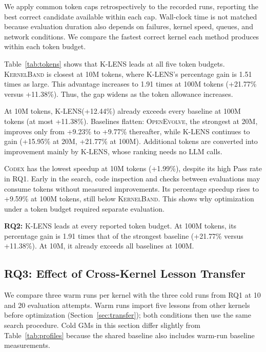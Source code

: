 \documentclass[acmsmall,screen,review,anonymous,nonacm]{acmart}
\newcommand{\klens}{\textsc{K-LENS}\xspace}
\newcommand{\kernelband}{\textsc{KernelBand}\xspace}
\newcommand{\openevolve}{\textsc{OpenEvolve}\xspace}
\newcommand{\standardcodex}{\textsc{Codex}\xspace}
\newenvironment{klensresultbox}{%
  \par\addvspace{0.5\baselineskip plus 2pt}%
  \noindent
  \begingroup
  \setlength{\fboxrule}{0.3mm}%
  \setlength{\fboxsep}{\dimexpr1mm+2pt\relax}%
  \begin{lrbox}{\klensresultcontent}%
  \begin{minipage}{\dimexpr\linewidth-2\fboxrule-2\fboxsep\relax}%
}{%
  \end{minipage}%
  \end{lrbox}%
  \fcolorbox{black!20}{gray!5}{\usebox{\klensresultcontent}}%
  \endgroup
  \par\addvspace{0.5\baselineskip plus 2pt}%
}
\begin{document}
We apply common token caps retrospectively to the recorded runs, reporting the best correct candidate available within each cap.
Wall-clock time is not matched because evaluation duration also depends on failures, kernel speed,
queues, and network conditions. We compare the fastest correct kernel each method produces
within each token budget.


Table~\ref{tab:tokens} shows that \klens leads at all five token budgets.
\kernelband is closest at 10M tokens, where \klens's percentage gain is
1.51 times as large. This advantage increases to 1.91 times at 100M
tokens (+21.77\% versus +11.38\%). Thus, the gap widens as the token
allowance increases.

At 10M tokens, \klens (+12.44\%) already exceeds every baseline at 100M tokens
(at most +11.38\%). Baselines flatten: \openevolve, the strongest at 20M, improves
only from +9.23\% to +9.77\% thereafter, while \klens continues to gain
(+15.95\% at 20M, +21.77\% at 100M). Additional tokens are converted into
improvement mainly by \klens, whose ranking needs no LLM calls.

\standardcodex has the lowest speedup at 10M tokens (+1.99\%), despite
its high Pass rate in RQ1. Early in the search, code inspection and
checks between evaluations may consume tokens without measured
improvements. Its percentage
speedup rises to +9.59\% at 100M tokens, still below \kernelband.
This shows why optimization under a token budget required separate evaluation.

\begin{klensresultbox}
\textbf{RQ2:} \klens leads at every reported token budget. At 100M tokens,
its percentage gain is 1.91 times that of the strongest baseline
(+21.77\% versus +11.38\%). At 10M, it already exceeds all baselines at 100M.
\end{klensresultbox}

\subsection{RQ3: Effect of Cross-Kernel Lesson Transfer}
\label{sec:rq3}

We compare three warm runs per kernel with the three cold
runs from RQ1 at 10 and 20 evaluation attempts. Warm runs import five
lessons from other kernels before optimization
(Section~\ref{sec:transfer}); both conditions then use the same search
procedure. Cold GMs in this section differ slightly from Table~\ref{tab:profiles}
because the shared baseline also includes warm-run baseline measurements.
\end{document}
